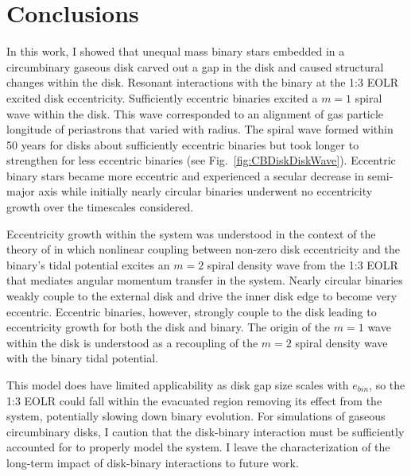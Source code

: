 \section{Conclusions}

In this work, I showed that unequal mass binary stars embedded in a circumbinary gaseous disk carved out a gap in the disk and caused structural changes 
within the disk.  Resonant interactions with the binary at the 1:3 EOLR excited disk eccentricity.  Sufficiently eccentric binaries excited a $m = 1$ spiral 
wave within the disk.  This wave corresponded to an alignment of gas particle longitude of periastrons that varied with radius.  The spiral wave formed within 50 
years for disks about sufficiently eccentric binaries but took longer to strengthen for less eccentric binaries (see Fig.~\ref{fig:CBDiskDiskWave}).  Eccentric binary stars 
became more eccentric and experienced a secular decrease in semi-major axis while initially nearly circular binaries underwent no eccentricity growth over the 
timescales considered.

Eccentricity growth within the system was understood in the context of the theory of \citet{Papaloizou2001} in which nonlinear coupling between non-zero disk 
eccentricity and the binary's tidal potential excites an $m = 2$ spiral density wave from the 1:3 EOLR that mediates angular momentum transfer in the system.  
Nearly circular binaries weakly couple to the external disk and drive the inner disk edge to become very eccentric.  Eccentric binaries, however, strongly couple 
to the disk leading to eccentricity growth for both the disk and binary.  The origin of the $m = 1$ wave within the disk is understood as a recoupling of the $m = 
2$ spiral density wave with the binary tidal potential.

This model does have limited applicability as disk gap size scales with $e_{bin}$, so the 1:3 EOLR could fall within the evacuated region removing its effect 
from the system, potentially slowing down binary evolution. For simulations of gaseous circumbinary disks, I caution that the disk-binary interaction must be 
sufficiently accounted for to properly model the system.  I leave the characterization of the long-term impact of disk-binary interactions to future work.

